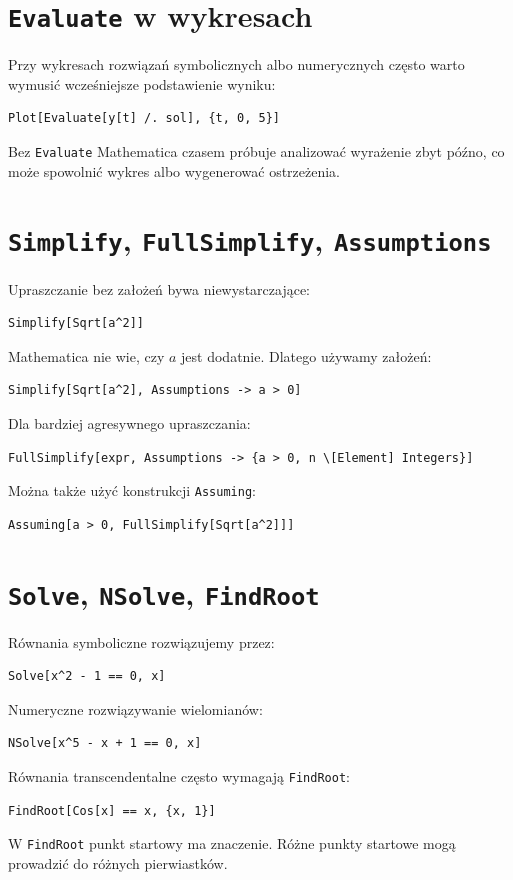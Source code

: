 \section{\texttt{Evaluate} w wykresach}

Przy wykresach rozwiązań symbolicznych albo numerycznych często warto wymusić wcześniejsze podstawienie wyniku:
\begin{verbatim}
Plot[Evaluate[y[t] /. sol], {t, 0, 5}]
\end{verbatim}
Bez \texttt{Evaluate} Mathematica czasem próbuje analizować wyrażenie zbyt późno, co może spowolnić wykres albo wygenerować ostrzeżenia.

\section{\texttt{Simplify}, \texttt{FullSimplify}, \texttt{Assumptions}}

Upraszczanie bez założeń bywa niewystarczające:
\begin{verbatim}
Simplify[Sqrt[a^2]]
\end{verbatim}
Mathematica nie wie, czy \(a\) jest dodatnie. Dlatego używamy założeń:
\begin{verbatim}
Simplify[Sqrt[a^2], Assumptions -> a > 0]
\end{verbatim}
Dla bardziej agresywnego upraszczania:
\begin{verbatim}
FullSimplify[expr, Assumptions -> {a > 0, n \[Element] Integers}]
\end{verbatim}

Można także użyć konstrukcji \texttt{Assuming}:
\begin{verbatim}
Assuming[a > 0, FullSimplify[Sqrt[a^2]]]
\end{verbatim}

\section{\texttt{Solve}, \texttt{NSolve}, \texttt{FindRoot}}

Równania symboliczne rozwiązujemy przez:
\begin{verbatim}
Solve[x^2 - 1 == 0, x]
\end{verbatim}
Numeryczne rozwiązywanie wielomianów:
\begin{verbatim}
NSolve[x^5 - x + 1 == 0, x]
\end{verbatim}
Równania transcendentalne często wymagają \texttt{FindRoot}:
\begin{verbatim}
FindRoot[Cos[x] == x, {x, 1}]
\end{verbatim}
W \texttt{FindRoot} punkt startowy ma znaczenie. Różne punkty startowe mogą prowadzić do różnych pierwiastków.

